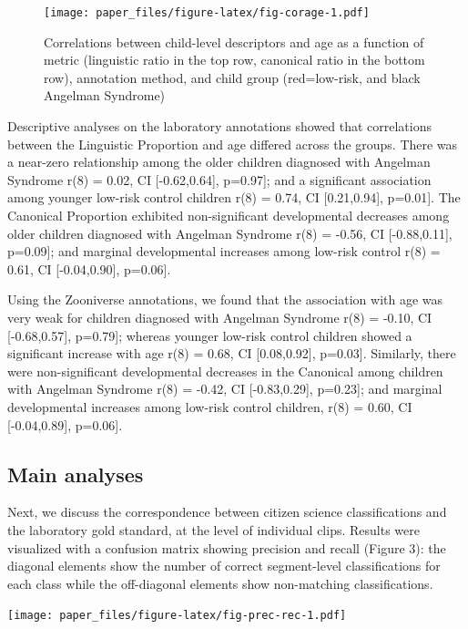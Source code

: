\documentclass[english,,man,floatsintext]{apa6}
\begin{document}
\begin{figure}
\centering
\texttt{[image: paper\_files/figure-latex/fig-corage-1.pdf]}
\caption{\label{fig:fig-corage}Correlations between child-level descriptors and age as a function of metric (linguistic ratio in the top row, canonical ratio in the bottom row), annotation method, and child group (red=low-risk, and black Angelman Syndrome)}
\end{figure}

Descriptive analyses on the laboratory annotations showed that correlations between the Linguistic Proportion and age differed across the groups. There was a near-zero relationship among the older children diagnosed with Angelman Syndrome r(8) = 0.02, CI {[}-0.62,0.64{]}, p=0.97{]}; and a significant association among younger low-risk control children r(8) = 0.74, CI {[}0.21,0.94{]}, p=0.01{]}. The Canonical Proportion exhibited non-significant developmental decreases among older children diagnosed with Angelman Syndrome r(8) = -0.56, CI {[}-0.88,0.11{]}, p=0.09{]}; and marginal developmental increases among low-risk control r(8) = 0.61, CI {[}-0.04,0.90{]}, p=0.06{]}.

Using the Zooniverse annotations, we found that the association with age was very weak for children diagnosed with Angelman Syndrome r(8) = -0.10, CI {[}-0.68,0.57{]}, p=0.79{]}; whereas younger low-risk control children showed a significant increase with age r(8) = 0.68, CI {[}0.08,0.92{]}, p=0.03{]}. Similarly, there were non-significant developmental decreases in the Canonical among children with Angelman Syndrome r(8) = -0.42, CI {[}-0.83,0.29{]}, p=0.23{]}; and marginal developmental increases among low-risk control children, r(8) = 0.60, CI {[}-0.04,0.89{]}, p=0.06{]}.

\hypertarget{main-analyses}{%
\subsection{Main analyses}\label{main-analyses}}

Next, we discuss the correspondence between citizen science classifications and the laboratory gold standard, at the level of individual clips. Results were visualized with a confusion matrix showing precision and recall (Figure 3): the diagonal elements show the number of correct segment-level classifications for each class while the off-diagonal elements show non-matching classifications.

\texttt{[image: paper\_files/figure-latex/fig-prec-rec-1.pdf]}
\end{document}
